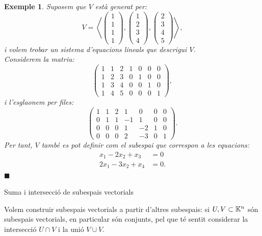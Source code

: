\documentclass[
  11pt,
]{book}
\makeatletter
\numberwithin{dummy}{section}
\theoremstyle{maincolornumbox}
\theoremstyle{blacknumex}
\newtheorem{exampleT}{Exemple}[chapter]
\theoremstyle{blacknumbox}
\theoremstyle{maincolornum}
\newenvironment{example}{\begin{exampleT}}{\hfill{\tiny\ensuremath{\blacksquare}}\end{exampleT}}
\renewcommand{\section}{\@startsection{section}{1}{\z@}
{-4ex \@plus -1ex \@minus -.4ex}
{1ex \@plus.2ex }
{\normalfont\large\sffamily\bfseries}}
\newlength\esp
\makeatother
\begin{document}
\begin{example}
Suposem que \(V\) està generat per: \[V=\left\langle
    \begin{pmatrix}1 \\ 1 \\ 1 \\ 1  \end{pmatrix},
    \begin{pmatrix}1 \\ 2 \\ 3 \\ 4  \end{pmatrix},
    \begin{pmatrix}2 \\ 3 \\ 4 \\ 5  \end{pmatrix}\right\rangle,\] i
volem trobar un sistema d'equacions lineals que descrigui \(V\).\\
Considerem la matriu: \[\left(
    \begin{array}{ccc|cccc}
    1 & 1 & 2 & 1 & 0 & 0 & 0\\
    1 & 2 & 3 & 0 & 1 & 0 & 0\\
    1 & 3 & 4 & 0 & 0 & 1 & 0\\
    1 & 4 & 5 & 0 & 0 & 0 & 1
    \end{array}
    \right),\] i l'esglaonem per files: \[\left(
    \begin{array}{ccc|rrcc}
    1 & 1 & 2 & 1 & 0 & 0 & 0\\
    0 & 1 & 1 & -1 & 1 & 0 & 0\\ \hline
    0 & 0 & 0 & 1 & -2 & 1 & 0\\
    0 & 0 & 0 & 2 & -3 & 0 & 1
    \end{array}
    \right).\] Per tant, \(V\) també es pot definir com el subespai que
correspon a les equacions: \begin{align*}
    x_1-2x_2+x_3&=0\\ 2x_1-3x_2+x_4&=0.
\end{align*}
\end{example}

\hypertarget{suma-i-intersecciuxf3-de-subespais-vectorials}{%
\section{Suma i intersecció de subespais vectorials}\label{suma-i-intersecciuxf3-de-subespais-vectorials}}

Volem construir subespais vectorials a partir d'altres subespais: si
\(U,V\subset \mathbb{K}^n\) són subespais vectorials, en particular són conjunts,
pel que té sentit considerar la intersecció \(U\cap V\) i la unió
\(V\cup V\).
\end{document}
